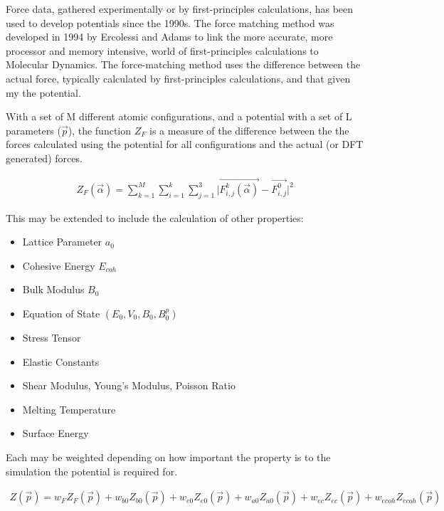 Force data, gathered experimentally or by first-principles calculations, has been used to develop potentials since the 1990s.  The force matching method was developed in 1994 by Ercolessi and Adams \cite{forcematchingmethod} to link the more accurate, more processor and memory intensive, world of first-principles calculations to Molecular Dynamics.  The force-matching method uses the difference between the actual force, typically calculated by first-principles calculations, and that given my the potential.

With a set of M different atomic configurations, and a potential with a set of L parameters ($ \vec{p} $), the function $Z_F$ is a measure of the difference between the the forces calculated using the potential for all configurations and the actual (or DFT generated) forces.

\begin{equation}
\begin{split}
Z_F(\vec{\alpha}) = \sum _{k=1}^M \sum _{i=1} ^{k} \sum _{j=1} ^{3} \lvert \vec{F^k_{i,j} (\vec{\alpha})} - \vec{F^0_{i,j}} \rvert^2
\end{split}
\label{eq:eqForceMatchingB}
\end{equation}

This may be extended to include the calculation of other properties:

\begin{itemize}
\item Lattice Parameter $a_0$
\item Cohesive Energy $E_{coh}$
\item Bulk Modulus $B_{0}$
\item Equation of State $(E_{0}, V_{0}, B_0, {B^{p}_0})$
\item Stress Tensor
\item Elastic Constants
\item Shear Modulus, Young's Modulus, Poisson Ratio
\item Melting Temperature
\item Surface Energy
\end{itemize}

Each may be weighted depending on how important the property is to the simulation the potential is required for.

\begin{equation}
\begin{split}
Z(\vec{p}) = w_{F} Z_F(\vec{p}) + w_{b0} Z_{b0}(\vec{p}) + w_{e0} Z_{e0}(\vec{p}) + w_{a0} Z_{a0}(\vec{p}) + w_{ec} Z_{ec}(\vec{p}) + w_{ecoh} Z_{ecoh}(\vec{p})
\end{split}
\label{eq:eqForceMatchingA}
\end{equation}

